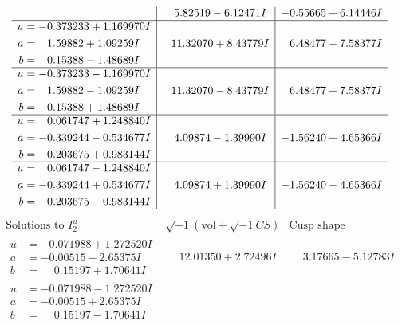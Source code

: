 \documentclass[1p]{elsarticle_modified}
\theoremstyle{definition}
\newcommand{\I}{\sqrt{-1}}
\begin{document}
$$\begin{array}{c|c|c}
 & \phantom{-}5.82519 - 6.12471 I & -0.55665 + 6.14446 I \\ \hline\begin{aligned}
u &= -0.373233 + 1.169970 I \\
a &= \phantom{-}1.59882 + 1.09259 I \\
b &= \phantom{-}0.15388 - 1.48689 I\end{aligned}
 & \phantom{-}11.32070 + 8.43779 I & \phantom{-}6.48477 - 7.58377 I \\ \hline\begin{aligned}
u &= -0.373233 - 1.169970 I \\
a &= \phantom{-}1.59882 - 1.09259 I \\
b &= \phantom{-}0.15388 + 1.48689 I\end{aligned}
 & \phantom{-}11.32070 - 8.43779 I & \phantom{-}6.48477 + 7.58377 I \\ \hline\begin{aligned}
u &= \phantom{-}0.061747 + 1.248840 I \\
a &= -0.339244 - 0.534677 I \\
b &= -0.203675 + 0.983144 I\end{aligned}
 & \phantom{-}4.09874 - 1.39990 I & -1.56240 + 4.65366 I \\ \hline\begin{aligned}
u &= \phantom{-}0.061747 - 1.248840 I \\
a &= -0.339244 + 0.534677 I \\
b &= -0.203675 - 0.983144 I\end{aligned}
 & \phantom{-}4.09874 + 1.39990 I & -1.56240 - 4.65366 I\\
 \hline 
 \end{array}$$\newpage$$\begin{array}{c|c|c}  
\text{Solutions to }I^u_{2}& \I (\text{vol} + \sqrt{-1}CS) & \text{Cusp shape}\\
 \hline 
\begin{aligned}
u &= -0.071988 + 1.272520 I \\
a &= -0.00515 - 2.65375 I \\
b &= \phantom{-}0.15197 + 1.70641 I\end{aligned}
 & \phantom{-}12.01350 + 2.72496 I & \phantom{-}3.17665 - 5.12783 I \\ \hline\begin{aligned}
u &= -0.071988 - 1.272520 I \\
a &= -0.00515 + 2.65375 I \\
b &= \phantom{-}0.15197 - 1.70641 I\end{aligned}

\end{array}$$
\end{document}
